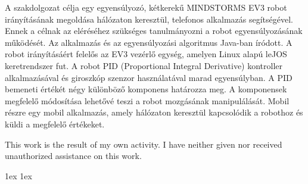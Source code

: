 \documentclass[final]{ubb_dolgozat}
\author{
Márton Zete-Örs
}
\begin{document}
\begin{abstractEN}
	
A szakdolgozat célja egy egyensúlyozó, kétkerekű MINDSTORMS EV3 robot irányításának megoldása hálózaton keresztül, telefonos alkalmazás segítségével. Ennek a célnak az eléréséhez szükséges tanulmányozni a robot egyensúlyozásának működését. Az alkalmazás és az egyensúlyozási algoritmus Java-ban íródott. A robot irányításáért felelős az EV3 vezérlő egység, amelyen Linux alapú leJOS keretrendszer fut. A robot PID (Proportional Integral Derivative) kontroller alkalmazásával és giroszkóp szenzor használatával marad egyensúlyban. A PID bemeneti értékét négy különböző komponens határozza meg. A komponensek megfelelő módosítása lehetővé teszi a robot mozgásának manipulálását. Mobil részre egy mobil alkalmazás, amely hálózaton keresztül kapcsolódik a robothoz és küldi a megfelelő értékeket.

This work is the result of my own activity. I have neither given nor received unauthorized assistance on this work.

\end{abstractEN}

\maketitle

{ \baselineskip 1ex
  \parskip 1ex
  \tableofcontents
}

%


%
%
%
%
\appendix
{ 
  \renewcommand{\baselinestretch}{1.0}\normalsize %
  \setlength{\itemsep}{-2.4mm}
  \setlength{\bibspacing}{0.67\baselineskip}
  
  
}
\end{document}
